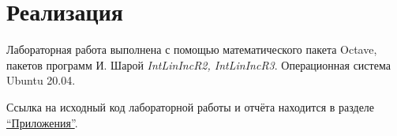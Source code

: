 \section{Реализация}

Лабораторная работа выполнена с помощью математического пакета Octave, пакетов программ И. Шарой \textit{IntLinIncR2, IntLinIncR3}. Операционная система Ubuntu 20.04.

Ссылка на исходный код лабораторной работы и отчёта находится в разделе \hyperref[app]{``Приложения''}.